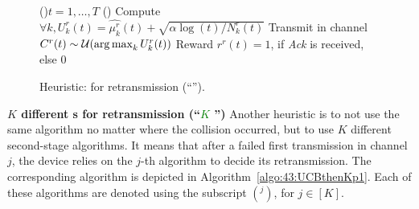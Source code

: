 \begin{figure}[h!]
	\centering
    \begin{framed}
	\begin{algorithm}[H]
		\For(){$t = 1, \dots, T$}{
			\Else(){
				Compute $\forall k, U^r_k(t) = \widehat{\mu^r_k}(t) + \sqrt{\alpha \log(t) / N_k^r(t)}$\;
				Transmit in channel $C^r(t) \sim \mathcal{U}(\operatorname*{arg\,max}_k U^r_k(t))$\;
				Reward $r^r(t) = 1$, if \emph{Ack} is received, else $0$\;
			}
		}
		\caption[Heuristic: \UCB{} for retransmission.]{Heuristic: \UCB{} for retransmission (``\textcolor{purple}{\UCB{}}'').}    %
		\label{algo:43:TwoUCB}
	\end{algorithm}
	\end{framed}
\end{figure}


\textbf{$K$ different {\UCB}s for retransmission (``\textcolor{green}{$K$ \UCB}'')}\label{sub:43:UCBthenKp1}
%
Another heuristic is to not use the same algorithm no matter where the collision occurred, but to use $K$ different second-stage \UCB{} algorithms.
It means that after a failed first transmission in channel $j$, the device relies on the $j$-th algorithm to decide its retransmission.
The corresponding algorithm is depicted in Algorithm~\ref{algo:43:UCBthenKp1}.
Each of these algorithms are denoted using the subscript $({}^{j})$, for $j\in[K]$.

